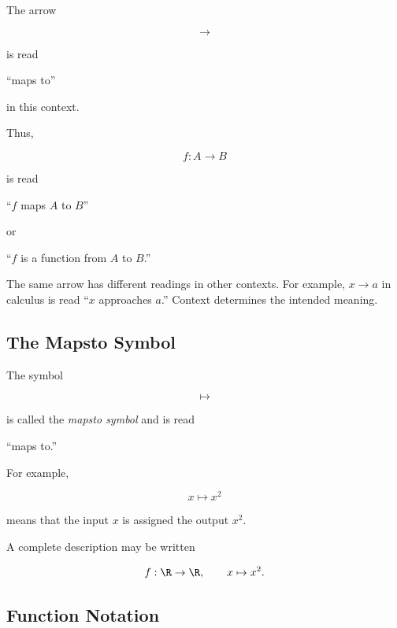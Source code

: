 The arrow

\[ \to \]

is read

\begin{center}
``maps to''
\end{center}

in this context.

Thus,

\[ f:A\to B \]

is read

\begin{center}
``\(f\) maps \(A\) to \(B\)''
\end{center}

or

\begin{center}
``\(f\) is a function from \(A\) to \(B\).''
\end{center}

The same arrow has different readings in other contexts. For example,
\(x\to a\) in calculus is read ``\(x\) approaches \(a\).'' Context determines
the intended meaning.

\subsection{The Mapsto Symbol}
\label{subsec:mapsto-symbol}

The symbol

\[ \mapsto \]

is called the \emph{mapsto symbol} and is read

\begin{center}
``maps to.''
\end{center}

For example,

\[ x\mapsto x^2 \]

means that the input \(x\) is assigned the output \(x^2\).

A complete description may be written

\[ f:\R\to\R,\qquad x\mapsto x^2. \]

\subsection{Function Notation}
\label{subsec:function-notation}

